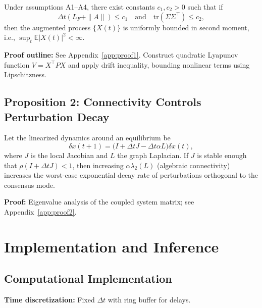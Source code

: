 \documentclass[12pt]{article}
\begin{document}
\begin{theorem}
\label{thm:boundedness}
Under assumptions A1–A4, there exist constants $c_1,c_2>0$ such that if
\begin{equation}
\Delta t (L_F + \|A\|) \le c_1 \quad\text{and}\quad \mathrm{tr}(\Sigma\Sigma^\top) \le c_2,
\end{equation}
then the augmented process $\{X(t)\}$ is uniformly bounded in second moment, i.e., $\sup_t \mathbb{E}|X(t)|^2<\infty$.
\end{theorem}

\textbf{Proof outline:} See Appendix~\ref{app:proof1}. Construct quadratic Lyapunov function $V=X^\top P X$ and apply drift inequality, bounding nonlinear terms using Lipschitzness.

\subsection{Proposition 2: Connectivity Controls Perturbation Decay}
\label{subsec:prop2}

\begin{proposition}
\label{prop:connectivity}
Let the linearized dynamics around an equilibrium be
\begin{equation}
\delta x(t+1) = \big(I + \Delta t J - \Delta t \alpha L\big) \delta x(t),
\end{equation}
where $J$ is the local Jacobian and $L$ the graph Laplacian. If $J$ is stable enough that $\rho(I+\Delta t J)<1$, then increasing $\alpha\lambda_2(L)$ (algebraic connectivity) increases the worst-case exponential decay rate of perturbations orthogonal to the consensus mode.
\end{proposition}

\textbf{Proof:} Eigenvalue analysis of the coupled system matrix; see Appendix~\ref{app:proof2}.

\section{Implementation and Inference}
\label{sec:implementation}

\subsection{Computational Implementation}
\label{subsec:impl}

\textbf{Time discretization:} Fixed $\Delta t$ with ring buffer for delays.
\end{document}
